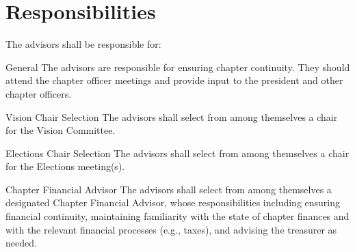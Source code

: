 \section{Responsibilities}
The advisors shall be responsible for:

\begin{enumsubsection}
\item{General} The advisors are responsible for ensuring chapter continuity. They should attend the chapter officer meetings and provide input to the president and other chapter officers.

\item{Vision Chair Selection} The advisors shall select from among themselves a chair for the Vision Committee.\label{sec:visionChair}

\item{Elections Chair Selection} The advisors shall select from among themselves a chair for the Elections meeting(s).

\item{Chapter Financial Advisor} The advisors shall select from among themselves a designated Chapter Financial Advisor, whose responsibilities including ensuring financial continuity, maintaining familiarity with the state of chapter finances and with the relevant financial processes (e.g., taxes), and advising the treasurer as needed.

\end{enumsubsection}
